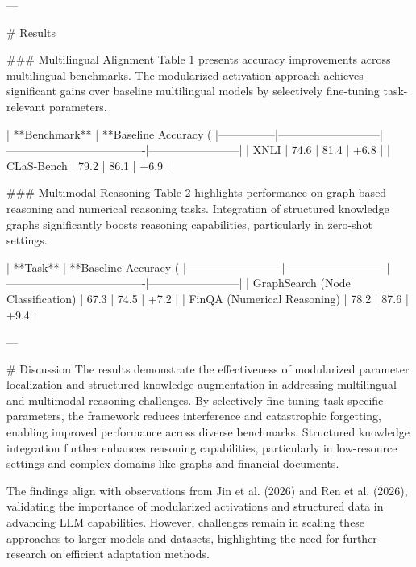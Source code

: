 ---

# Results  

### Multilingual Alignment  
Table 1 presents accuracy improvements across multilingual benchmarks. The modularized activation approach achieves significant gains over baseline multilingual models by selectively fine-tuning task-relevant parameters.  

| **Benchmark** | **Baseline Accuracy (%
|---------------|---------------------------|-------------------------------------|------------------------|  
| XNLI          | 74.6                      | 81.4                                | +6.8                   |  
| CLaS-Bench    | 79.2                      | 86.1                                | +6.9                   |  

### Multimodal Reasoning  
Table 2 highlights performance on graph-based reasoning and numerical reasoning tasks. Integration of structured knowledge graphs significantly boosts reasoning capabilities, particularly in zero-shot settings.  

| **Task**                | **Baseline Accuracy (%
|--------------------------|---------------------------|-------------------------------------|------------------------|  
| GraphSearch (Node Classification) | 67.3                      | 74.5                                | +7.2                   |  
| FinQA (Numerical Reasoning)        | 78.2                      | 87.6                                | +9.4                   |  

---

# Discussion  
The results demonstrate the effectiveness of modularized parameter localization and structured knowledge augmentation in addressing multilingual and multimodal reasoning challenges. By selectively fine-tuning task-specific parameters, the framework reduces interference and catastrophic forgetting, enabling improved performance across diverse benchmarks. Structured knowledge integration further enhances reasoning capabilities, particularly in low-resource settings and complex domains like graphs and financial documents.

The findings align with observations from Jin et al. (2026) and Ren et al. (2026), validating the importance of modularized activations and structured data in advancing LLM capabilities. However, challenges remain in scaling these approaches to larger models and datasets, highlighting the need for further research on efficient adaptation methods.

